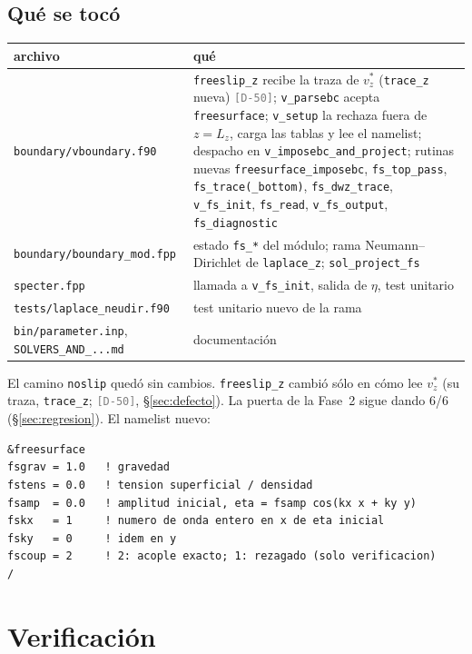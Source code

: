 \documentclass[11pt,a4paper]{article}
\newcommand{\etq}[1]{\textcolor{gray}{\texttt{[#1]}}}
\newcommand{\FaseDosRegresion}{6/6}
\begin{document}
\subsection{Qué se tocó}

\begin{center}\small
\begin{tabular}{p{4.6cm}p{10.2cm}}
\toprule
archivo & qué \\ \midrule
\texttt{boundary/vboundary.f90} & \texttt{freeslip\_z} recibe la traza de $v^*_z$
  (\texttt{trace\_z} nueva) \etq{D-50}; \texttt{v\_parsebc} acepta \texttt{freesurface}; \texttt{v\_setup}
  la rechaza fuera de $z=L_z$, carga las tablas y lee el namelist; despacho en
  \texttt{v\_imposebc\_and\_project}; rutinas nuevas \texttt{freesurface\_imposebc},
  \texttt{fs\_top\_pass}, \texttt{fs\_trace(\_bottom)}, \texttt{fs\_dwz\_trace},
  \texttt{v\_fs\_init}, \texttt{fs\_read}, \texttt{v\_fs\_output}, \texttt{fs\_diagnostic}\\
\texttt{boundary/boundary\_mod.fpp} & estado \texttt{fs\_*} del módulo; rama
  Neumann--Dirichlet de \texttt{laplace\_z}; \texttt{sol\_project\_fs} \\
\texttt{specter.fpp} & llamada a \texttt{v\_fs\_init}, salida de $\eta$, test unitario \\
\texttt{tests/laplace\_neudir.f90} & test unitario nuevo de la rama \\
\texttt{bin/parameter.inp}, \texttt{SOLVERS\_AND\_...md} & documentación \\
\bottomrule
\end{tabular}
\end{center}
El camino \texttt{noslip} quedó sin cambios. \texttt{freeslip\_z} cambió sólo en cómo lee
$v^*_z$ (su traza, \texttt{trace\_z}; \etq{D-50}, §\ref{sec:defecto}). La puerta de la
Fase~2 sigue dando \FaseDosRegresion{} (§\ref{sec:regresion}). El namelist nuevo:
\begin{lstlisting}
&freesurface
fsgrav = 1.0   ! gravedad
fstens = 0.0   ! tension superficial / densidad
fsamp  = 0.0   ! amplitud inicial, eta = fsamp cos(kx x + ky y)
fskx   = 1     ! numero de onda entero en x de eta inicial
fsky   = 0     ! idem en y
fscoup = 2     ! 2: acople exacto; 1: rezagado (solo verificacion)
/
\end{lstlisting}

\section{Verificación}
\end{document}
